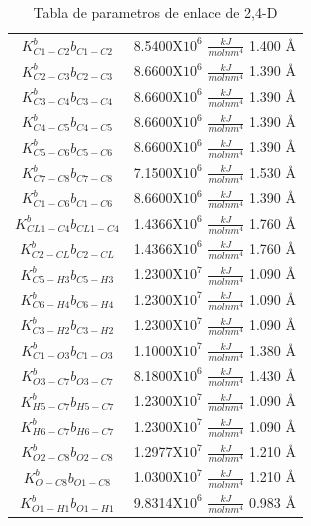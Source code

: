 \begin{table}[!h]
    \centering
    \begin{tabular}{|c|c|}
    \hline
    $K^b_{C1-C2} b_{C1-C2}$   & 8.5400X$10^6$ $\frac{kJ}{molnm^4}$ 1.400 \AA\\
    $K^b_{C2-C3} b_{C2-C3}$   & 8.6600X$10^6$ $\frac{kJ}{molnm^4}$ 1.390 \AA\\
    $K^b_{C3-C4} b_{C3-C4}$   & 8.6600X$10^6$ $\frac{kJ}{molnm^4}$ 1.390 \AA\\
    $K^b_{C4-C5} b_{C4-C5}$   & 8.6600X$10^6$ $\frac{kJ}{molnm^4}$ 1.390 \AA\\
    $K^b_{C5-C6} b_{C5-C6}$   & 8.6600X$10^6$ $\frac{kJ}{molnm^4}$ 1.390 \AA\\
    $K^b_{C7-C8} b_{C7-C8}$   & 7.1500X$10^6$ $\frac{kJ}{molnm^4}$ 1.530 \AA\\
    $K^b_{C1-C6} b_{C1-C6}$   & 8.6600X$10^6$ $\frac{kJ}{molnm^4}$ 1.390 \AA\\
    $K^b_{CL1-C4} b_{CL1-C4}$ & 1.4366X$10^6$ $\frac{kJ}{molnm^4}$ 1.760 \AA\\
    $K^b_{C2-CL} b_{C2-CL}$   & 1.4366X$10^6$ $\frac{kJ}{molnm^4}$ 1.760 \AA\\
    $K^b_{C5-H3} b_{C5-H3}$   & 1.2300X$10^7$ $\frac{kJ}{molnm^4}$ 1.090 \AA\\
    $K^b_{C6-H4} b_{C6-H4}$   & 1.2300X$10^7$ $\frac{kJ}{molnm^4}$ 1.090 \AA\\
    $K^b_{C3-H2} b_{C3-H2}$   & 1.2300X$10^7$ $\frac{kJ}{molnm^4}$ 1.090 \AA\\
    $K^b_{C1-O3} b_{C1-O3}$   & 1.1000X$10^7$ $\frac{kJ}{molnm^4}$ 1.380 \AA\\
    $K^b_{O3-C7} b_{O3-C7}$   & 8.1800X$10^6$ $\frac{kJ}{molnm^4}$ 1.430 \AA\\
    $K^b_{H5-C7} b_{H5-C7}$   & 1.2300X$10^7$ $\frac{kJ}{molnm^4}$ 1.090 \AA\\
    $K^b_{H6-C7} b_{H6-C7}$   & 1.2300X$10^7$ $\frac{kJ}{molnm^4}$ 1.090 \AA\\
    $K^b_{O2-C8} b_{O2-C8}$   & 1.2977X$10^7$ $\frac{kJ}{molnm^4}$ 1.210 \AA\\
    $K^b_{O-C8}  b_{O1-C8}$   & 1.0300X$10^7$ $\frac{kJ}{molnm^4}$ 1.210 \AA\\
    $K^b_{O1-H1} b_{O1-H1}$   & 9.8314X$10^6$ $\frac{kJ}{molnm^4}$ 0.983 \AA\\
    \hline
    \end{tabular}
    \caption{Tabla de parametros de enlace de 2,4-D}
    \label{tab:enlace24D}
\end{table}



